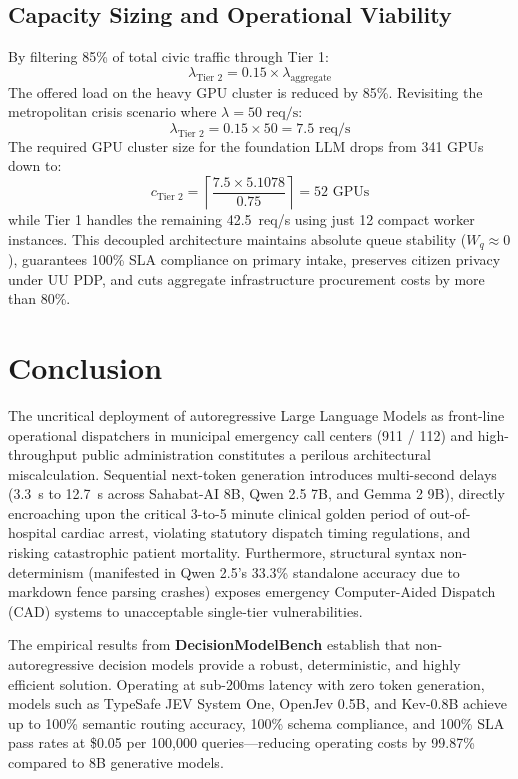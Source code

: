 \documentclass[journal,compsoc]{IEEEtran}
\begin{document}
\subsection{Capacity Sizing and Operational Viability}
By filtering 85\% of total civic traffic through Tier 1:
\begin{equation}
\lambda_{\text{Tier 2}} = 0.15 \times \lambda_{\text{aggregate}}
\end{equation}
The offered load on the heavy GPU cluster is reduced by 85\%. Revisiting the metropolitan crisis scenario where $\lambda = 50 \text{ req/s}$:
\begin{equation}
\lambda_{\text{Tier 2}} = 0.15 \times 50 = 7.5 \text{ req/s}
\end{equation}
The required GPU cluster size for the foundation LLM drops from 341 GPUs down to:
\begin{equation}
c_{\text{Tier 2}} = \left\lceil \frac{7.5 \times 5.1078}{0.75} \right\rceil = 52 \text{ GPUs}
\end{equation}
while Tier 1 handles the remaining 42.5~req/s using just 12 compact worker instances. This decoupled architecture maintains absolute queue stability ($W_q \approx 0$), guarantees 100\% SLA compliance on primary intake, preserves citizen privacy under UU PDP, and cuts aggregate infrastructure procurement costs by more than 80\%.

\section{Conclusion}
The uncritical deployment of autoregressive Large Language Models as front-line operational dispatchers in municipal emergency call centers (911 / 112) and high-throughput public administration constitutes a perilous architectural miscalculation. Sequential next-token generation introduces multi-second delays (3.3~s to 12.7~s across Sahabat-AI 8B, Qwen 2.5 7B, and Gemma 2 9B), directly encroaching upon the critical 3-to-5 minute clinical golden period of out-of-hospital cardiac arrest, violating statutory dispatch timing regulations, and risking catastrophic patient mortality. Furthermore, structural syntax non-determinism (manifested in Qwen 2.5's 33.3\% standalone accuracy due to markdown fence parsing crashes) exposes emergency Computer-Aided Dispatch (CAD) systems to unacceptable single-tier vulnerabilities.

The empirical results from \textbf{DecisionModelBench} establish that non-autoregressive decision models provide a robust, deterministic, and highly efficient solution. Operating at sub-200ms latency with zero token generation, models such as TypeSafe JEV System One, OpenJev 0.5B, and Kev-0.8B achieve up to 100\% semantic routing accuracy, 100\% schema compliance, and 100\% SLA pass rates at \$0.05 per 100,000 queries—reducing operating costs by 99.87\% compared to 8B generative models.
\end{document}
